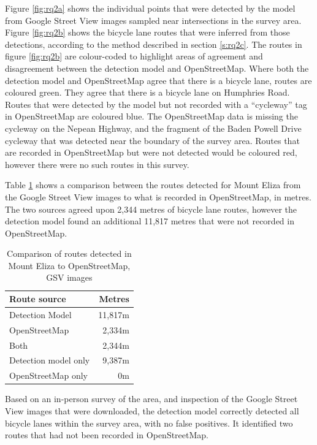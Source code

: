 \documentclass[11pt,twoside]{report}
\begin{document}
Figure \ref{fig:rq2a} shows the individual points that were detected by the model from Google Street View images sampled near intersections in the survey area.  Figure \ref{fig:rq2b} shows the bicycle lane routes that were inferred from those detections, according to the method described in section \ref{s:rq2c}.  The routes in figure \ref{fig:rq2b} are colour-coded to highlight areas of agreement and disagreement between the detection model and OpenStreetMap.  Where both the detection model and OpenStreetMap agree that there is a bicycle lane, routes are coloured green.  They agree that there is a bicycle lane on Humphries Road.  Routes that were detected by the model but not recorded with a ``cycleway'' tag in OpenStreetMap are coloured blue.  The OpenStreetMap data is missing the cycleway on the Nepean Highway, and the fragment of the Baden Powell Drive cycleway that was detected near the boundary of the survey area.  Routes that are recorded in OpenStreetMap but were not detected would be coloured red, however there were no such routes in this survey.

Table \ref{table_metres_rq2_me} shows a comparison between the routes detected for Mount Eliza from the Google Street View images to what is recorded in OpenStreetMap, in metres.  The two sources agreed upon 2,344 metres of bicycle lane routes, however the detection model found an additional 11,817 metres that were not recorded in OpenStreetMap.

\begin{table}[h]
\centering
\begin{tabular}{|l|r||}
\hline
\textbf{Route source} & \textbf{Metres} \\
\hline
Detection Model & 11,817m \\
OpenStreetMap & 2,334m \\
Both & 2,344m \\
Detection model only & 9,387m \\
OpenStreetMap only & 0m \\
\hline
\end{tabular}
\caption{Comparison of routes detected in Mount Eliza to OpenStreetMap, GSV images}
\label{table_metres_rq2_me}
\end{table}

Based on an in-person survey of the area, and inspection of the Google Street View images that were downloaded, the detection model correctly detected all bicycle lanes within the survey area, with no false positives.  It identified two routes that had not been recorded in OpenStreetMap.
 
\end{document}
